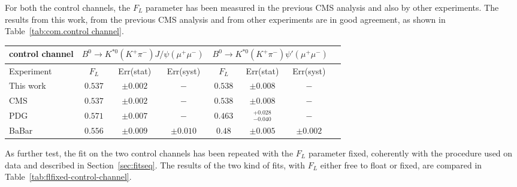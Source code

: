 For both the control channels, the $F_L$ parameter has been measured in the previous CMS analysis and also by other experiments.
The results from this work, from the previous CMS analysis and from other experiments are in good agreement, as shown in Table~\ref{tab:com.control channel}.

\begin{table*}[!htb]
  \begin {center}
    \begin{small}
      \caption{Measurements from CMS (both in this and in the previous analysis), PDG, and BaBar\cite{BaBar2} of $F_L$ in the control channels.
        The first uncertainty is statistical and the second is systematic.
        \label{tab:com.control channel}}
      \begin{tabular}{l|c|c|c|c|c|c|c}
        control channel & \multicolumn{3}{|c|}{$B^0 \rightarrow K^{*0}(K^+\pi^-) J/\psi(\mu^+ \mu^-)$} & \multicolumn{3}{|c|}{$B^0 \rightarrow K^{*0}(K^+\pi^-) \psi'(\mu^+ \mu^-)$}\\
        \hline
        Experiment  & $F_L$  &  Err(stat) & Err(syst) & $F_L$  &  Err(stat) & Err(syst)\\
        \hline
        This work & $0.537$ & $\pm0.002$ &  $-$  & $0.538$ & $\pm0.008$ &  $-$\\
        \hline
        CMS   &  $0.537$ & $\pm0.002$ &  $-$    &  $0.538$ & $\pm0.008$ &  $-$  \\
        \hline
        PDG   &  $0.571$ & $\pm0.007$ & $-$      &  $0.463$ & $^{+0.028}_{-0.040} $ & $-$ \\
        \hline
        BaBar &  $0.556$ & $\pm0.009$ & $\pm0.010 $   &  $0.48$ & $\pm0.005$ & $\pm0.002 $\\
      \end{tabular}
    \end{small}
  \end{center}
\end{table*}

As further test, the fit on the two control channels has been repeated with the $F_L$ parameter fixed, coherently with the procedure used on data and described in Section~\ref{sec:fitseq}.
The results of the two kind of fits, with $F_L$ either free to float or fixed, are compared in Table~\ref{tab:flfixed-control-channel}.

